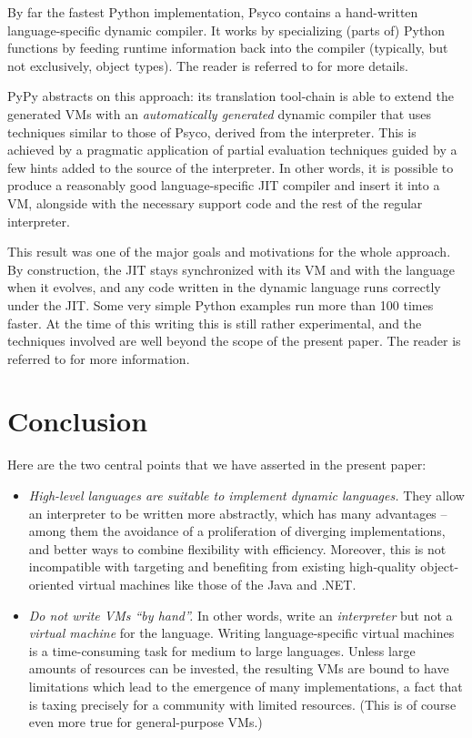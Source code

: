 \documentclass{llncs}
\begin{document}
By far the fastest Python implementation, Psyco \cite{psyco-software}
contains a hand-written language-specific dynamic compiler.  It works by
specializing (parts of) Python functions by feeding runtime information
back into the compiler (typically, but not exclusively, object types).
The reader is referred to \cite{Psyco-paper} for more details.

PyPy abstracts on this approach: its translation tool-chain is able to
extend the generated VMs with an \emph{automatically generated} dynamic
compiler that uses techniques similar to those of Psyco, derived from
the interpreter.  This is achieved by a pragmatic application of partial
evaluation techniques guided by a few hints added to the source of the
interpreter.  In other words, it is possible to produce a reasonably
good language-specific JIT compiler and insert it into a VM, alongside
with the necessary support code and the rest of the regular interpreter.

This result was one of the major goals and motivations for the whole
approach.  By construction, the JIT stays synchronized with its VM
and with the language when it evolves,
and any code written in the dynamic language runs
correctly under the JIT.  Some very simple Python examples run more than
100 times faster.  At the time of this writing this is still rather
experimental, and the techniques involved are well beyond the scope of
the present paper.  The reader is referred to \cite{D08.2} for more
information.


\section{Conclusion}

Here are the two central points that we have asserted in the present
paper:

\begin{itemize}
\item \emph{High-level languages are suitable to implement dynamic languages.}
They allow an interpreter to be written more abstractly, which has many
advantages -- among them the avoidance of a proliferation of diverging
implementations, and better ways to combine flexibility with efficiency.
Moreover, this is not incompatible with targeting and benefiting from
existing high-quality object-oriented virtual machines like those of the
Java and .NET.

\item \emph{Do not write VMs ``by hand''.}
In other words, write an \emph{interpreter} but not a
\emph{virtual machine} for the language.
Writing language-specific virtual machines is a time-consuming task for
medium to large languages.  Unless large amounts of resources can be
invested, the resulting VMs are bound to have limitations which lead to
the emergence of many implementations, a fact that is taxing precisely
for a community with limited resources.  (This is of course even more
true for general-purpose VMs.)
\end{itemize}
\end{document}
